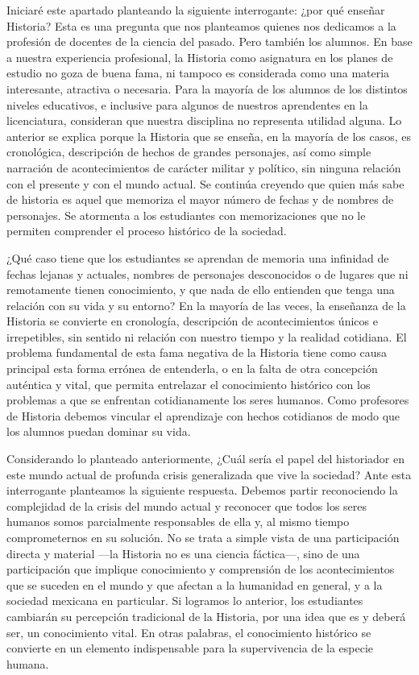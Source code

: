 \enlargethispage{1\baselineskip}
Iniciaré este apartado planteando la siguiente interrogante: ¿por qué 
enseñar Historia? Esta es una pregunta que nos planteamos quienes nos 
dedicamos a la profesión de docentes de la ciencia del pasado. Pero 
también los alumnos. En base a nuestra experiencia profesional, la 
Historia como asignatura en los planes de estudio no goza de buena 
fama, ni tampoco es considerada como una materia interesante, atractiva 
o necesaria. Para la mayoría de los alumnos de los distintos niveles 
educativos, e inclusive para algunos de nuestros aprendentes en la 
licenciatura, consideran que nuestra disciplina no representa utilidad 
alguna. Lo anterior se explica porque la Historia que se enseña, en la 
mayoría de los casos, es cronológica, descripción de hechos de grandes 
personajes, así como simple narración de acontecimientos de carácter 
militar y político, sin ninguna relación con el presente y con el mundo 
actual. Se continúa creyendo que quien más sabe de historia es aquel 
que memoriza el mayor número de fechas y de nombres de personajes. Se 
atormenta a los estudiantes con memorizaciones que no le permiten 
comprender el proceso histórico de la sociedad.

¿Qué caso tiene que los estudiantes se aprendan de memoria una 
infinidad de fechas lejanas y actuales, nombres de personajes 
desconocidos o de lugares que ni remotamente tienen conocimiento, y que 
nada de ello entienden que tenga una relación con su vida y su entorno? 
En la mayoría de las veces, la enseñanza de la Historia  se convierte 
en cronología, descripción de acontecimientos únicos e irrepetibles, 
sin sentido ni relación con nuestro tiempo y la realidad cotidiana.  El 
problema fundamental de esta fama negativa de la Historia tiene como 
causa principal esta forma errónea de entenderla, o en la falta de otra 
concepción auténtica y vital, que permita entrelazar el conocimiento 
histórico con los problemas a que se enfrentan cotidianamente los seres 
humanos. Como profesores de Historia debemos vincular el aprendizaje 
con hechos cotidianos de modo que los alumnos puedan dominar su vida. 

Considerando lo planteado anteriormente, ¿Cuál sería el papel del 
historiador en este mundo actual de profunda crisis generalizada que 
vive la sociedad? Ante esta interrogante planteamos la siguiente 
respuesta. Debemos partir reconociendo la complejidad de la crisis del 
mundo actual y reconocer que todos los seres humanos somos parcialmente 
responsables de ella y, al mismo tiempo comprometernos en su solución. 
No se trata a simple vista de una participación directa y material ---la 
Historia no es una ciencia fáctica---, sino de una participación que 
implique conocimiento y comprensión de los acontecimientos que se 
suceden en el mundo y que afectan a la humanidad en general, y a la 
sociedad mexicana en particular. Si logramos lo anterior, los 
estudiantes cambiarán su percepción tradicional de la Historia, por una 
idea que es y deberá ser, un conocimiento vital. En otras palabras, el 
conocimiento histórico se convierte en un elemento indispensable para 
la supervivencia de la especie humana.  
\enlargethispage{-1\baselineskip}

